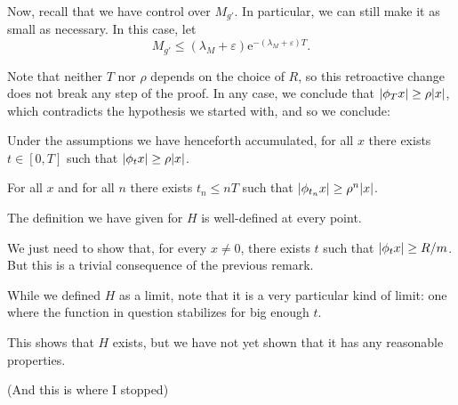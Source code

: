 \documentclass{article}
\newcommand{\e}{\mathrm{e}}
\DeclarePairedDelimiter{\abs}{\lvert}{\rvert}
\begin{document}
Now, recall that we have control over $M_{g'}$. In particular, we can still make it as small as necessary. In this case, let
\[M_{g'} \leq (\lambda_M + \varepsilon) \e^{-(\lambda_M + \varepsilon) T}.\]

Note that neither $T$ nor $\rho$ depends on the choice of $R$, so this retroactive change does not break any step of the proof. In any case, we conclude that $\abs{\phi_T x} \geq \rho \abs{x}$, which contradicts the hypothesis we started with, and so we conclude:

\begin{Lemma}
Under the assumptions we have henceforth accumulated, for all $x$ there exists $t \in [0,T]$ such that $\abs{\phi_t x} \geq \rho \abs{x}$.
\end{Lemma}

\begin{Corollary}
For all $x$ and for all $n$ there exists $t_n \leq n T$ such that $\abs{\phi_{t_n} x} \geq \rho^n \abs x$.
\end{Corollary}

\begin{Proposition}
The definition we have given for $H$ is well-defined at every point.
\end{Proposition}

\begin{Proof}
We just need to show that, for every $x \neq 0$, there exists $t$ such that $\abs{\phi_t x} \geq R/m$. But this is a trivial consequence of the previous remark.
\end{Proof}

\begin{Remark}
While we defined $H$ as a limit, note that it is a very particular kind of limit: one where the function in question stabilizes for big enough $t$.
\end{Remark}

This shows that $H$ exists, but we have not yet shown that it has any reasonable properties.

(And this is where I stopped)
\end{document}
